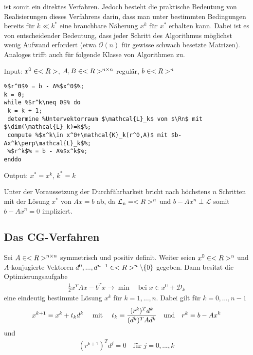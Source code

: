  ist somit ein direktes Verfahren. Jedoch besteht die praktische Bedeutung von Realisierungen dieses Verfahrens darin, dass man unter bestimmten Bedingungen bereits für $k\ll k^\ast$ eine brauchbare Näherung $x^k$ für $x^\ast$ erhalten kann. Dabei ist es von entscheidender Bedeutung, dass jeder Schritt des Algorithmus möglichst wenig Aufwand erfordert (etwa $\mathcal{O}(n)$ für gewisse schwach besetzte Matrizen). Analoges trifft auch für folgende Klasse von Algorithmen zu.

\begin{algorithm}
	Input: $x^0\in<R>$, $A,B\in<R>^{n \times n}$ regulär, $b\in<R>^n$
	\begin{lstlisting}
%$r^0$% = b - A%$x^0$%;
k = 0;
while %$r^k\neq 0$% do
 k = k + 1;
 determine %Untervektorraum $\mathcal{L}_k$ von $\Rn$ mit $\dim(\mathcal{L}_k)=k$%;
 compute %$x^k\in x^0+\mathcal{K}_k(r^0,A)$ mit $b-Ax^k\perp\mathcal{L}_k$%;
 %$r^k$% = b - A%$x^k$%;
enddo
	\end{lstlisting}
	Output: $x^\ast=x^k$, $k^\ast=k$
\end{algorithm}

Unter der Voraussetzung der Durchführbarkeit bricht  nach höchstens $n$ Schritten mit der Lösung $x^\ast$ von $Ax=b$ ab, da $\mathcal{L}_n=<R>^n$ und $b-Ax^n\perp\mathcal{L}$ somit $b-Ax^n=0$ impliziert.

\subsection{Das CG-Verfahren}

\begin{lemma}
	Sei $A\in<R>^{n \times n}$ symmetrisch und positiv definit. Weiter seien $x^0\in<R>^n$ und $A$-konjugierte Vektoren $d^0,...,d^{n-1}\in<R>^n\backslash\{0\}$ gegeben. Dann besitzt die Optimierungsaufgabe
	\begin{align}
		\label{2_15}
		\frac{1}{2}x^TAx-b^Tx\to\min\quad\text{bei } x\in x^0+\mathcal{D}_k
	\end{align}
	eine eindeutig bestimmte Lösung $x^k$ für $k=1,...,n$. Dabei gilt für $k=0,...,n-1$
	\begin{align}
		\label{2_16}
		x^{k+1} = x^k + t_kd^k\quad\mit\quad t_k = \frac{(r^k)^Td^k}{(d^k)^TAd^k}\quad\text{und}\quad r^k=b-Ax^k
	\end{align}
	und
	\begin{align}
		\label{2_17}
		(r^{k+1})^Td^j = 0\quad\text{für } j=0,...,k
	\end{align}
\end{lemma}

